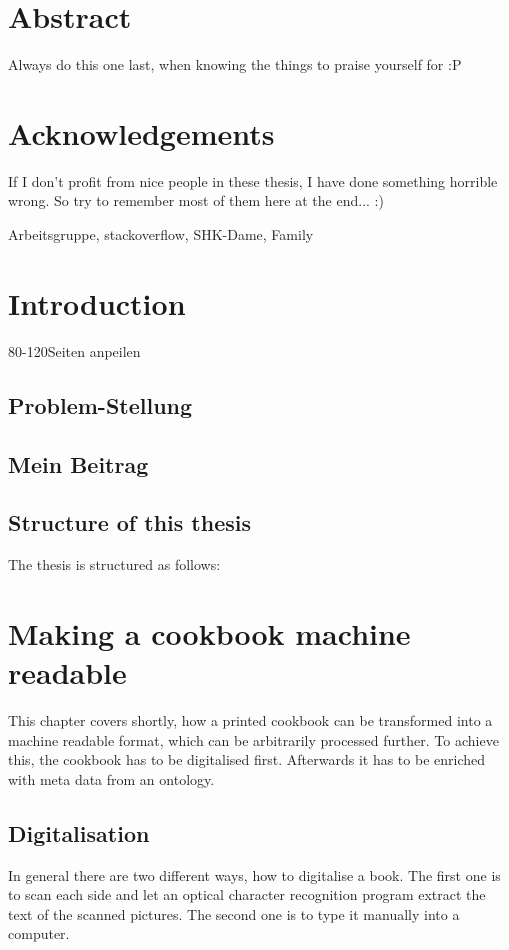 \documentclass[12pt, twoside]{report}
\begin{document}
\chapter*{Abstract}
Always do this one last, when knowing the things to praise  yourself for :P

\chapter*{Acknowledgements}
If I don't profit from nice people in these thesis, I have done something horrible wrong. So try to remember most of them here at the end... :)

Arbeitsgruppe, stackoverflow, SHK-Dame, Family
\tableofcontents

\listoffigures
\begingroup
	\let\clearpage\relax
	\listoftables
\endgroup

\clearpage
{}  
\chapter{Introduction}
80-120Seiten anpeilen
\section{Problem-Stellung}
\section{Mein Beitrag}
\section{Structure of this thesis}
The thesis is structured as follows:




\chapter{Making a cookbook machine readable}
This chapter covers shortly, how a printed cookbook can be transformed into a machine readable format, which can be arbitrarily processed further. To achieve this, the cookbook has to be digitalised first. Afterwards it has to be enriched with meta data from an ontology.

\section{Digitalisation}
In general there are two different ways, how to digitalise a book. The first one is to scan each side and let an optical character recognition program extract the text of the scanned pictures. The second one is to type it manually into a computer.
\end{document}
